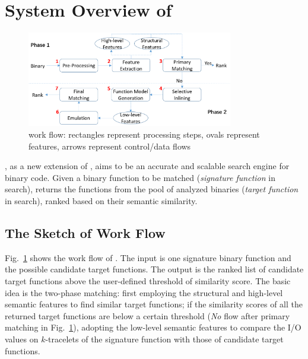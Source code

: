 
\section{System Overview of \toolNew} \label{subsec:motivate_eg}

\begin{figure}[t]
\begin{center}
\includegraphics[width=9cm]{srj-figures/bingo_e_arch.png}
\caption{\toolNew work flow: rectangles represent processing steps, ovals represent features, arrows represent control/data flows}
\label{fig:archi}
\end{center}
\end{figure}

\toolNew, as a new extension of \tool, aims to be an accurate and scalable search engine for binary code. Given a binary function to be matched (\emph{signature function} in search), \toolNew returns the functions from the pool of analyzed binaries (\emph{target function} in search), ranked based on their semantic similarity.

\subsection{The Sketch of Work Flow} \label{subsec:workflow}

Fig.~\ref{fig:archi} shows the work flow of \toolNew. The input is one signature binary function and the possible candidate target functions. The output is the ranked list of candidate target functions above the user-defined threshold of similarity score. %
The basic idea is the two-phase matching: first employing the structural and high-level semantic features to find similar target functions;
if the similarity scores of all the returned target functions are below a certain threshold (\emph{No} flow after primary matching in Fig.~\ref{fig:archi}),  adopting the low-level semantic features to compare the I/O values on  $k$-tracelets of the signature function with those of candidate target functions.

